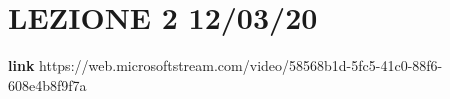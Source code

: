 \section{LEZIONE 2 12/03/20}
\textbf{link} https://web.microsoftstream.com/video/58568b1d-5fc5-41c0-88f6-608e4b8f9f7a
\subsubsection{}